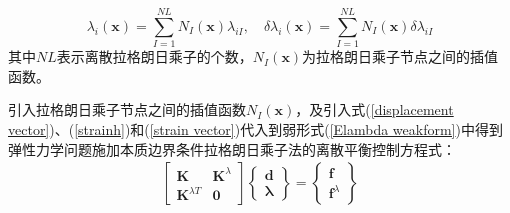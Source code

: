 \begin{equation}\label{lambdalisan}
\lambda_i(\pmb{x})=\sum_{I=1}^{N\!L}N_I(\pmb{x})\lambda_{iI},\quad
\delta\lambda_i(\pmb{x})=\sum_{I=1}^{N\!L}N_I(\pmb{x})\delta\lambda_{iI}
\end{equation}
其中$N\!L$表示离散拉格朗日乘子的个数，$N_I(\pmb{x})$为拉格朗日乘子节点之间的插值函数。\par
引入拉格朗日乘子节点之间的插值函数$N_I(\pmb{x})$，及引入式(\ref{displacement vector})、(\ref{strainh})和(\ref{strain vector})代入到弱形式(\ref{Elambda weakform})中得到弹性力学问题施加本质边界条件拉格朗日乘子法的离散平衡控制方程式：
\begin{equation}
\begin{split}
    \left[\begin{matrix}\pmb{K}&\pmb{K}^{\lambda}\\\pmb{K}^{\lambda T}&\pmb{0}\end{matrix}\right]
    \left\{\begin{matrix}\pmb{d}\\\pmb{\lambda}\end{matrix}\right\}=
    \left\{\begin{matrix}\pmb{f}\\\pmb{f}^{\lambda}\end{matrix}\right\}
\end{split}
\end{equation}

